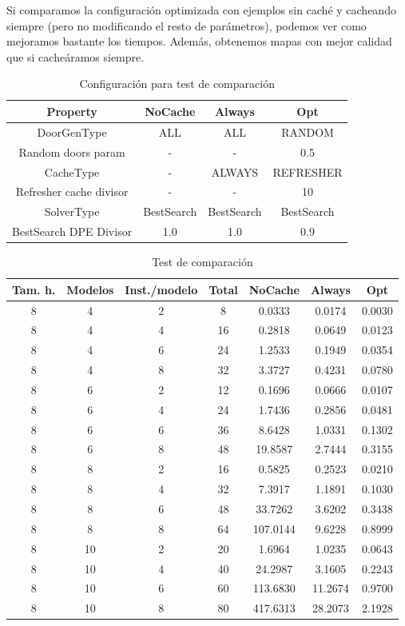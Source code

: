 Si comparamos la configuración optimizada con ejemplos sin caché y cacheando siempre (pero no modificando el resto de parámetros), podemos ver como mejoramos bastante los tiempos. Además, obtenemos mapas con mejor calidad que si cacheáramos siempre.

\begin{table}[H]
\begin{center}
	\begin{tabular}{ | c | c | c | c | }
\hline
Property & NoCache & Always & Opt \\ \hline
DoorGenType & ALL & ALL & RANDOM \\
Random doors param & - & - & 0.5 \\
CacheType & - & ALWAYS & REFRESHER \\
Refresher cache divisor & - & - & 10 \\
SolverType & BestSearch & BestSearch & BestSearch \\
BestSearch DPE Divisor & 1.0 & 1.0 & 0.9 \\
\hline
	\end{tabular}
\end{center}
\caption{Configuración para test de comparación}
\label{table:cfg-comp}
\end{table}


\begin{table}[H]
\begin{center}
	\begin{tabular}{ | c | c | c | c | c | c | c | }
\hline
Tam. h. & Modelos & Inst./modelo & Total & NoCache & Always & Opt \\ \hline 
8 & 4 & 2 & 8 & 0.0333 & 0.0174 & 0.0030 \\ 
8 & 4 & 4 & 16 & 0.2818 & 0.0649 & 0.0123 \\ 
8 & 4 & 6 & 24 & 1.2533 & 0.1949 & 0.0354 \\ 
8 & 4 & 8 & 32 & 3.3727 & 0.4231 & 0.0780 \\ 
8 & 6 & 2 & 12 & 0.1696 & 0.0666 & 0.0107 \\ 
8 & 6 & 4 & 24 & 1.7436 & 0.2856 & 0.0481 \\ 
8 & 6 & 6 & 36 & 8.6428 & 1.0331 & 0.1302 \\ 
8 & 6 & 8 & 48 & 19.8587 & 2.7444 & 0.3155 \\ 
8 & 8 & 2 & 16 & 0.5825 & 0.2523 & 0.0210 \\ 
8 & 8 & 4 & 32 & 7.3917 & 1.1891 & 0.1030 \\ 
8 & 8 & 6 & 48 & 33.7262 & 3.6202 & 0.3438 \\ 
8 & 8 & 8 & 64 & 107.0144 & 9.6228 & 0.8999 \\ 
8 & 10 & 2 & 20 & 1.6964 & 1.0235 & 0.0643 \\
8 & 10 & 4 & 40 & 24.2987 & 3.1605 & 0.2243 \\
8 & 10 & 6 & 60 & 113.6830 & 11.2674 & 0.9700 \\
8 & 10 & 8 & 80 & 417.6313 & 28.2073 & 2.1928 \\
\hline
	\end{tabular}
\end{center}
\caption{Test de comparación}
\label{table:comp}
\end{table}


